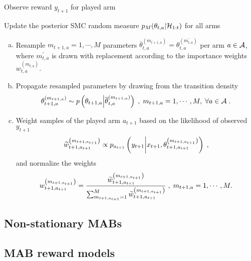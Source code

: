 \begin{algorithm}
\begin{algorithmic}[1]
		\vspace*{1ex}
		\STATE Observe reward $y_{t+1}$ for played arm
		
		\vspace*{1ex}
		\STATE Update the posterior SMC random measure $p_M(\theta_{t,a}|\mathcal{H}_{1:t})$ for all arms\\
		
		\begin{enumerate}[(a)]
			\vspace*{-1ex}
			\item Resample $m_{t+1,a}=1,\cdots, M$ parameters $\overline{\theta}_{t,a}^{(m_{t+1,a})}=\theta_{t,a}^{(m_{t,a}^\prime)}$ per arm $a\in \mathcal{A}$,
			where $m_{t,a}^\prime$ is drawn with replacement according to the importance weights $w_{t,a}^{(m_{t,a})}$.

			\vspace*{-1ex}
			\item Propagate resampled parameters by drawing from the transition density
			\vspace*{-1ex}
			\begin{equation}		
				\theta_{t+1,a}^{(m_{t+1,a})} \sim p\left(\theta_{t+1,a} \middle| \overline{\theta}_{t,a}^{(m_{t+1,a})}\right) \; , \; m_{t+1,a}=1,\cdots, M, \; \forall a \in \A \; .
				\label{eq:sir-mab-propagate}
			\vspace*{-2ex}
			\end{equation}
			
			\vspace*{-1ex}
			\item Weight samples of the played arm $a_{t+1}$ based on the likelihood of observed $y_{t+1}$
			\vspace*{-1ex}
			\begin{equation}
				\widetilde{w}_{t+1,a_{t+1}}^{\left(m_{t+1,a_{t+1}}\right)} \propto p_{a_{t+1}}\left(y_{t+1} \middle|  x_{t+1},\theta_{t+1,a_{t+1}}^{\left(m_{t+1,a_{t+1}}\right)}\right) \; ,
				\label{eq:sir-mab-weights}
			\vspace*{-2ex}
			\end{equation}
			and normalize the weights
			\vspace*{-1ex}
			\begin{equation}
				w_{t+1,a_{t+1}}^{\left(m_{t+1,a_{t+1}}\right)}=\frac{\widetilde{w}_{t+1,a_{t+1}}^{\left(m_{t+1,a_{t+1}}\right)}}{\sum_{m_{t+1,a_{t+1}}=1}^M\widetilde{w}_{t+1,a_{t+1}}^{\left(m_{t+1,a_{t+1}}\right)}} \; , \; m_{t+1,a}=1,\cdots, M.
				\label{eq:sir-mab-weights-norm}
			\vspace*{-2ex}
			\end{equation}
		\end{enumerate}
		\vspace*{-2ex}
		\ENDFOR
	\end{algorithmic}
\end{algorithm}

\subsection{Non-stationary MABs}
\label{ssec:linear_mixing_dynamics}


\subsection{MAB reward models}
\label{ssec:mab_reward_models}


